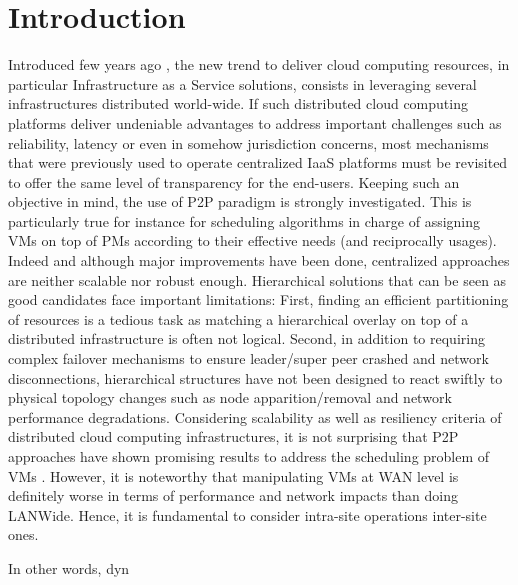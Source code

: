 \section{Introduction}
Introduced few years ago \cite{greenberg:sigcomm09}, the new trend to deliver
cloud computing resources, in particular Infrastructure as a Service solutions,
consists in leveraging several infrastructures  distributed world-wide. If such
distributed cloud computing platforms deliver undeniable advantages to address
important challenges such as reliability, latency or even in somehow
jurisdiction concerns, most mechanisms that were previously used to operate
centralized IaaS platforms must be revisited to offer the same level of
transparency for the end-users.  Keeping such an objective in mind, the use of
P2P paradigm is strongly investigated. This is particularly true for instance
for scheduling algorithms in charge of assigning VMs on top of PMs according to
their effective needs (and reciprocally usages).  Indeed and although major
improvements have been done, centralized approaches \cite{hermenier:2013} are
neither scalable nor robust enough.  Hierarchical solutions
\cite{feller:ccgrid12} that can be seen as good candidates face important
limitations: First, finding an efficient partitioning of resources is a tedious task as
matching a hierarchical overlay on top of a distributed infrastructure is often not logical. 
Second, in addition to requiring complex failover mechanisms to
ensure leader/super peer crashed and network disconnections, hierarchical
structures have not been designed to react swiftly to physical topology
changes such as node apparition/removal and network performance degradations. 
Considering scalability as well as resiliency criteria of distributed cloud computing infrastructures, 
it is not surprising that P2P approaches have shown promising results to address the scheduling problem of VMs \cite{xxx,quesnel:2012,feller:cloudcom12}.
However, it is noteworthy that manipulating VMs at WAN level is definitely worse in terms of performance and network impacts than doing LANWide. 
Hence,  it is fundamental to consider intra-site operations \vs inter-site ones.

 In other words, dyn

 
 
